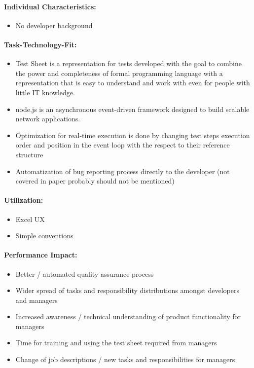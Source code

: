 \paragraph{Individual Characteristics:}
\begin{itemize}
	\item  No developer background
\end{itemize}

\paragraph{Task-Technology-Fit:}
\begin{itemize}
	\item Test Sheet is a representation for tests developed with the goal to combine the power and completeness of formal programming language with a representation that is easy to understand and work with even for people with little IT knowledge\cite{ts}.
	\item node.js is an asynchronous event-driven framework designed to build scalable network applications.
	\item Optimization for real-time execution is done by changing test steps execution order and position in the event loop with the respect to their reference structure
	\item Automatization of bug reporting process directly to the developer (not covered in paper probably should not be mentioned)
\end{itemize}

\paragraph{Utilization:}
\begin{itemize}
	\item Excel UX
	\item Simple conventions
\end{itemize}

\paragraph{Performance Impact:}
\begin{itemize}
	\item Better / automated quality assurance process
	\item Wider spread of tasks and responsibility distributions amongst developers and managers
	\item Increased awareness / technical understanding of product functionality for managers 
	\item Time for training and using the test sheet required from managers
	\item Change of job descriptions / new tasks and responsibilities for managers
\end{itemize}

